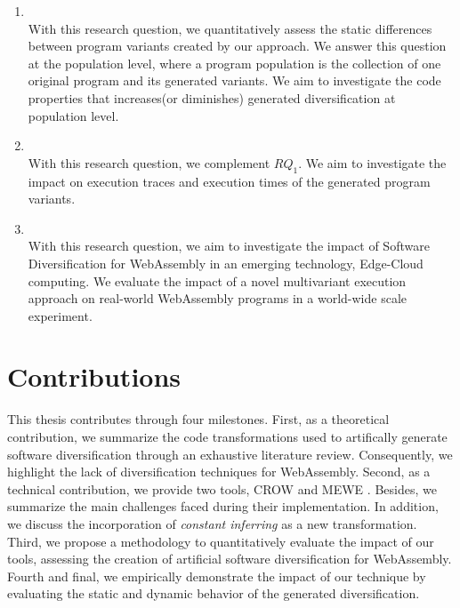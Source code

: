 \begin{enumerate}[label=\subscript{RQ}{{\arabic*}}]
    \item \textbf{\rqone}\\
    With this research question, we quantitatively assess the static differences between program variants created by our approach. We answer this question at the population level, where a program population is the collection of one original program and its generated variants. We aim to investigate the code properties that increases(or diminishes) generated diversification at population level. 

    \item \textbf{\rqtwo} \\
    With this research question, we complement $RQ_1$. We aim to investigate the impact on execution traces and execution times of the generated program variants.

    \item \textbf{\rqthree} \\
    With this research question, we aim to investigate the impact of Software Diversification for WebAssembly in an emerging technology, Edge-Cloud computing. We evaluate the impact of a novel multivariant execution approach on real-world WebAssembly programs in a world-wide scale experiment.
    
    
\end{enumerate}


\renewcommand{\rqone}{$RQ_1$. To what extent can we artifically generate program variants for WebAssembly?}

\renewcommand{\rqtwo}{$RQ_2$. To what extent are the generated variants dynamically different?}
\renewcommand{\rqthree}{$RQ_3$. To what extent do the artificial variants exhibit different execution times on Edge-Cloud platforms?}

\section{Contributions}

This thesis contributes through four milestones. First, as a theoretical contribution, we summarize the code transformations used to artifically generate software diversification through an exhaustive literature review. Consequently, we highlight the lack of diversification techniques for WebAssembly.  Second, as a technical contribution, we provide two tools, CROW \cite{CROW} and MEWE \cite{MEWE}. Besides, we summarize the main challenges faced during their implementation. In addition, we discuss the incorporation of \emph{constant inferring} as a new transformation. Third, we propose a methodology to quantitatively evaluate the impact of our tools, assessing the creation of artificial software diversification for WebAssembly. Fourth and final, we empirically demonstrate the impact of our technique by evaluating the static and dynamic behavior of the generated diversification.


